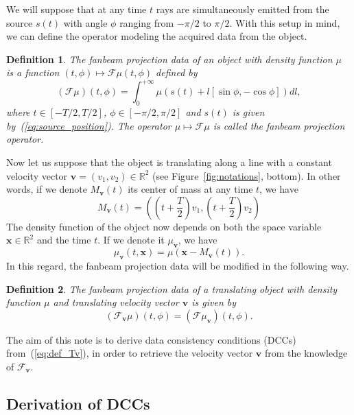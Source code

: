 \documentclass[twocolumn]{IEEEtran}
\numberwithin{equation}{section}
\newcommand{\R}{\mathbb{R}}
\newcommand{\bx}{\mathbf{x}}
\newcommand{\bv}{\mathbf{v}}
\newcommand{\Mbv}{M_{\mathbf{v}}}
\newcommand{\Tbv}{\mathcal{F}_{\mathbf{v}}}
\newcommand{\mubv}{\mu_{\mathbf{v}}}
\newtheorem{definition}{Definition}
\begin{document}
We will suppose that at any time $t$ rays are simultaneously emitted from the source $s(t)$ with angle $\phi$ ranging from $-\pi/2$ to $\pi/2$. With this setup in mind, we can define the operator modeling the acquired data from the object.
\begin{definition}
The \emph{fanbeam projection data} of an object with density function $\mu$ is a function $(t,\phi) \mapsto \mathcal{F}\mu(t,\phi)$ defined by
\begin{equation}
	(\mathcal{F}\mu)(t,\phi) = \int_0^{+\infty} \mu \left( s(t) + l \left[ \sin \phi, -\cos \phi \right] \right) dl,
\end{equation}
where $t \in \left[ -T/2, T/2\right]$, $\phi \in \left[ -\pi/2, \pi/2\right]$ and $s(t)$ is given by~(\ref{eq:source_position}). The operator $\mu \mapsto \mathcal{F}\mu$ is called the \emph{fanbeam projection operator}.
\end{definition}


Now let us suppose that the object is translating along a line with a constant velocity vector $\bv = (v_1, v_2)\in \R^2$ (see Figure~\ref{fig:notations}, bottom). In other words, if we denote $\Mbv(t)$ its center of mass at any time $t$, we have
\begin{equation}
	\Mbv(t) =  \left( \left( t + \frac{T}{2} \right)v_1, \left( t + \frac{T}{2} \right)v_2 \right)
\label{eq:center_of_mass}
\end{equation}
The density function of the object now depends on both the space variable $\bx \in \R^2$ and the time $t$. If we denote it $\mubv$, we have
\begin{equation}
	\mubv(t,\bx) = \mu\left( \bx - \Mbv(t)\right).
\end{equation}
In this regard, the fanbeam projection data will be modified in the following way.
\begin{definition}
The \emph{fanbeam projection data of a translating object} with density function $\mu$ and translating velocity vector $\bv$ is given by
\begin{equation}
	(\Tbv\mu)(t,\phi) =  ( \mathcal{F} \mubv ) (t,\phi).
\label{eq:def_Tv}
\end{equation}
\end{definition}

The aim of this note is to derive data consistency conditions (DCCs) from~(\ref{eq:def_Tv}), in order to retrieve the velocity vector $\bv$ from the knowledge of $\Tbv$.

\subsection{Derivation of DCCs}
\end{document}
